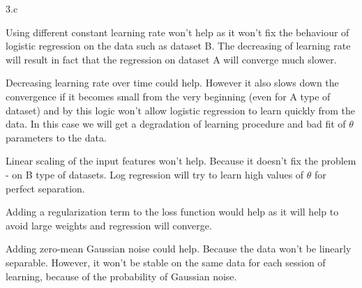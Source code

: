 \LARGE
3.c
\normalsize

\begin{answer}
  Using different constant learning rate won't help as it won't fix the behaviour of logistic regression on the data such as dataset B. The decreasing of learning rate will result in fact that the regression on dataset A will converge much slower.

  Decreasing learning rate over time could help. However it also slows down the convergence if it becomes small from the very beginning (even for A type of dataset) and by this logic won't allow logistic regression to learn quickly from the data. In this case we will get a degradation of learning procedure and bad fit of $\theta$ parameters to the data.

  Linear scaling of the input features won't help. Because it doesn't fix the problem - on B type of datasets. Log regression will try to learn high values of $\theta$ for perfect separation.

  Adding a regularization term to the loss function would help as it will help to avoid large weights and regression will converge.

  Adding zero-mean Gaussian noise could help. Because the data won't be linearly separable. However, it won't be stable on the same data for each session of learning, because of the probability of Gaussian noise.
\end{answer}


